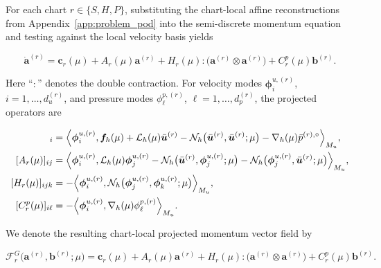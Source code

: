 \documentclass{article}
\begin{document}
For each chart $r\in\{S,H,P\}$, substituting the chart-local affine reconstructions
from Appendix~\ref{app:problem_pod} into the semi-discrete
momentum equation and testing against the local velocity basis yields


\begin{equation}
    \dot{\bm a}^{(r)}
    =
    \bm c_r(\mu)
    +
    A_r(\mu)\bm a^{(r)}
    +
    H_r(\mu):
    \bigl(
        \bm a^{(r)}\otimes\bm a^{(r)}
    \bigr)
    +
    C_r^p(\mu)\bm b^{(r)}.
    \label{eq:app_projected_momentum}
\end{equation}


Here ``$:$'' denotes the double contraction.
For velocity modes
$\bm\phi_i^{u,(r)}$,
$i=1,\ldots,d_u^{(r)}$,
and pressure modes
$\phi_\ell^{p,(r)}$,
$\ell=1,\ldots,d_p^{(r)}$,
the projected operators are


\begin{align}
    [\bm c_r(\mu)]_i
    &=
    \Bigl\langle
        \bm\phi_i^{u,(r)},
        \bm f_h(\mu)
        +
        \mathcal L_h(\mu)\bar{\bm u}^{(r)}
        -
        \mathcal N_h
        \bigl(
            \bar{\bm u}^{(r)},
            \bar{\bm u}^{(r)};
            \mu
        \bigr)
        -
        \nabla_h(\mu)\bar p^{(r),\circ}
    \Bigr\rangle_{M_u},
    \\
    [A_r(\mu)]_{ij}
    &=
    \Bigl\langle
        \bm\phi_i^{u,(r)},
        \mathcal L_h(\mu)\bm\phi_j^{u,(r)}
        -
        \mathcal N_h
        \bigl(
            \bar{\bm u}^{(r)},
            \bm\phi_j^{u,(r)};
            \mu
        \bigr)
        -
        \mathcal N_h
        \bigl(
            \bm\phi_j^{u,(r)},
            \bar{\bm u}^{(r)};
            \mu
        \bigr)
    \Bigr\rangle_{M_u},
    \\
    [H_r(\mu)]_{ijk}
    &=
    -
    \Bigl\langle
        \bm\phi_i^{u,(r)},
        \mathcal N_h
        \bigl(
            \bm\phi_j^{u,(r)},
            \bm\phi_k^{u,(r)};
            \mu
        \bigr)
    \Bigr\rangle_{M_u},
    \\
    [C_r^p(\mu)]_{i\ell}
    &=
    -
    \Bigl\langle
        \bm\phi_i^{u,(r)},
        \nabla_h(\mu)\phi_\ell^{p,(r)}
    \Bigr\rangle_{M_u}.
    \label{eq:app_projected_operators}
\end{align}



We denote the resulting chart-local projected momentum vector field by


\begin{equation}
    \mathcal F_r^G
    \bigl(
        \bm a^{(r)},
        \bm b^{(r)};
        \mu
    \bigr)
    =
    \bm c_r(\mu)
    +
    A_r(\mu)\bm a^{(r)}
    +
    H_r(\mu):
    \bigl(
        \bm a^{(r)}\otimes\bm a^{(r)}
    \bigr)
    +
    C_r^p(\mu)\bm b^{(r)}.
    \label{eq:app_galerkin_backbone}
\end{equation}
\end{document}
